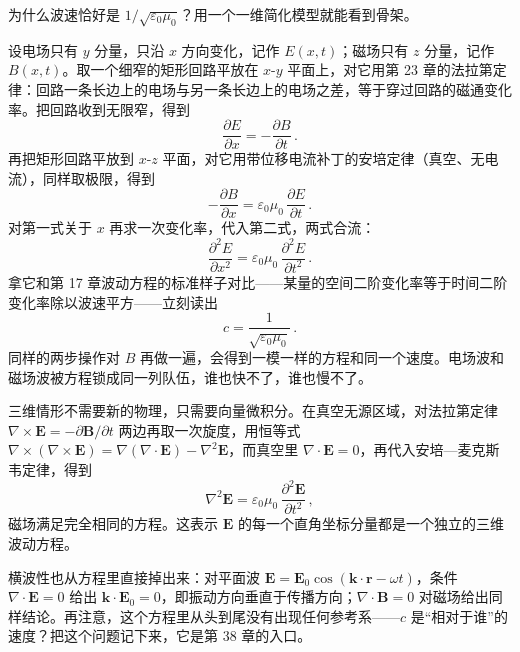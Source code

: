 \begin{mathbridge}
为什么波速恰好是 $1/\sqrt{\varepsilon_0\mu_0}$？用一个一维简化模型就能看到骨架。

设电场只有 $y$ 分量，只沿 $x$ 方向变化，记作 $E(x,t)$；磁场只有 $z$ 分量，记作 $B(x,t)$。取一个细窄的矩形回路平放在 $x$-$y$ 平面上，对它用第 23 章的法拉第定律：回路一条长边上的电场与另一条长边上的电场之差，等于穿过回路的磁通变化率。把回路收到无限窄，得到
\[
  \frac{\partial E}{\partial x}=-\frac{\partial B}{\partial t}\,.
\]
再把矩形回路平放到 $x$-$z$ 平面，对它用带位移电流补丁的安培定律（真空、无电流），同样取极限，得到
\[
  -\frac{\partial B}{\partial x}=\varepsilon_0\mu_0\,\frac{\partial E}{\partial t}\,.
\]
对第一式关于 $x$ 再求一次变化率，代入第二式，两式合流：
\[
  \frac{\partial^2 E}{\partial x^2}=\varepsilon_0\mu_0\,\frac{\partial^2 E}{\partial t^2}\,.
\]
拿它和第 17 章波动方程的标准样子对比——某量的空间二阶变化率等于时间二阶变化率除以波速平方——立刻读出
\[
  c=\frac{1}{\sqrt{\varepsilon_0\mu_0}}\,.
\]
同样的两步操作对 $B$ 再做一遍，会得到一模一样的方程和同一个速度。电场波和磁场波被方程锁成同一列队伍，谁也快不了，谁也慢不了。
\end{mathbridge}

\begin{challenge}
三维情形不需要新的物理，只需要向量微积分。在真空无源区域，对法拉第定律 $\nabla\times\bm E=-\partial\bm B/\partial t$ 两边再取一次旋度，用恒等式 $\nabla\times(\nabla\times\bm E)=\nabla(\nabla\cdot\bm E)-\nabla^2\bm E$，而真空里 $\nabla\cdot\bm E=0$，再代入安培—麦克斯韦定律，得到
\[
  \nabla^2\bm E=\varepsilon_0\mu_0\,\frac{\partial^2\bm E}{\partial t^2}\,,
\]
磁场满足完全相同的方程。这表示 $\bm E$ 的每一个直角坐标分量都是一个独立的三维波动方程。

横波性也从方程里直接掉出来：对平面波 $\bm E=\bm E_0\cos(\bm k\cdot\bm r-\omega t)$，条件 $\nabla\cdot\bm E=0$ 给出 $\bm k\cdot\bm E_0=0$，即振动方向垂直于传播方向；$\nabla\cdot\bm B=0$ 对磁场给出同样结论。再注意，这个方程里从头到尾没有出现任何参考系——$c$ 是“相对于谁”的速度？把这个问题记下来，它是第 38 章的入口。
\end{challenge}


